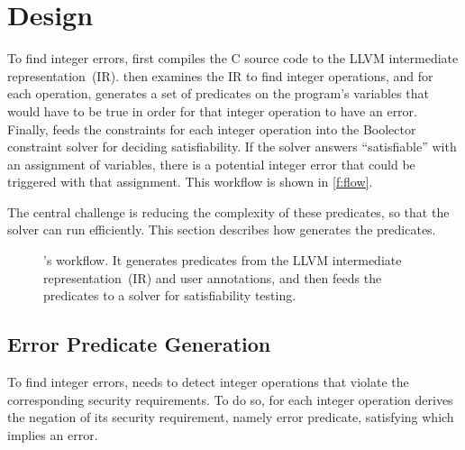 \section{Design}
\label{s:gen}

To find integer errors, \sys first compiles the C source code to the
LLVM intermediate representation~(IR).  \sys then examines the IR to
find integer operations, and for each operation, \sys generates a
set of predicates on the program's variables that would have to be
true in order for that integer operation to have an error.  Finally,
\sys feeds the constraints for each integer operation into the
Boolector constraint solver for deciding satisfiability.  If the
solver answers ``satisfiable'' with an assignment of variables,
there is a potential integer error that could be triggered with
that assignment.  This workflow is shown in \autoref{f:flow}.

The central challenge is reducing the complexity of these predicates,
so that the solver can run efficiently.  This section describes how
\sys generates the predicates.

\begin{figure}
\centering
\resizebox{\linewidth}{!}{

}
\caption{\sys's workflow.  It generates predicates from the LLVM
intermediate representation~(IR) and user annotations, and then feeds
the predicates to a solver for satisfiability testing.}
\label{f:flow}
\end{figure}

\subsection{Error Predicate Generation}
\label{s:gen:err}

To find integer errors, \sys needs to detect integer operations
that violate the corresponding security requirements.
To do so, for each integer operation \sys derives
the negation of its security requirement, namely error predicate,
satisfying which implies an error.

